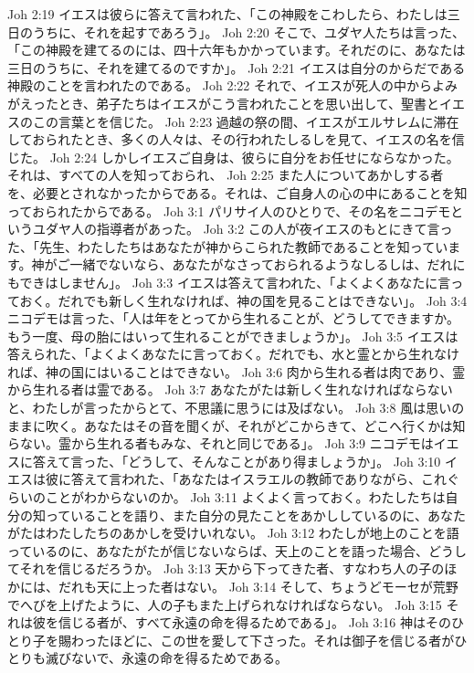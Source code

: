 Joh 2:19  イエスは彼らに答えて言われた、「この神殿をこわしたら、わたしは三日のうちに、それを起すであろう」。
Joh 2:20  そこで、ユダヤ人たちは言った、「この神殿を建てるのには、四十六年もかかっています。それだのに、あなたは三日のうちに、それを建てるのですか」。
Joh 2:21  イエスは自分のからだである神殿のことを言われたのである。
Joh 2:22  それで、イエスが死人の中からよみがえったとき、弟子たちはイエスがこう言われたことを思い出して、聖書とイエスのこの言葉とを信じた。
Joh 2:23  過越の祭の間、イエスがエルサレムに滞在しておられたとき、多くの人々は、その行われたしるしを見て、イエスの名を信じた。
Joh 2:24  しかしイエスご自身は、彼らに自分をお任せにならなかった。それは、すべての人を知っておられ、
Joh 2:25  また人についてあかしする者を、必要とされなかったからである。それは、ご自身人の心の中にあることを知っておられたからである。
Joh 3:1  パリサイ人のひとりで、その名をニコデモというユダヤ人の指導者があった。
Joh 3:2  この人が夜イエスのもとにきて言った、「先生、わたしたちはあなたが神からこられた教師であることを知っています。神がご一緒でないなら、あなたがなさっておられるようなしるしは、だれにもできはしません」。
Joh 3:3  イエスは答えて言われた、「よくよくあなたに言っておく。だれでも新しく生れなければ、神の国を見ることはできない」。
Joh 3:4  ニコデモは言った、「人は年をとってから生れることが、どうしてできますか。もう一度、母の胎にはいって生れることができましょうか」。
Joh 3:5  イエスは答えられた、「よくよくあなたに言っておく。だれでも、水と霊とから生れなければ、神の国にはいることはできない。
Joh 3:6  肉から生れる者は肉であり、霊から生れる者は霊である。
Joh 3:7  あなたがたは新しく生れなければならないと、わたしが言ったからとて、不思議に思うには及ばない。
Joh 3:8  風は思いのままに吹く。あなたはその音を聞くが、それがどこからきて、どこへ行くかは知らない。霊から生れる者もみな、それと同じである」。
Joh 3:9  ニコデモはイエスに答えて言った、「どうして、そんなことがあり得ましょうか」。
Joh 3:10  イエスは彼に答えて言われた、「あなたはイスラエルの教師でありながら、これぐらいのことがわからないのか。
Joh 3:11  よくよく言っておく。わたしたちは自分の知っていることを語り、また自分の見たことをあかししているのに、あなたがたはわたしたちのあかしを受けいれない。
Joh 3:12  わたしが地上のことを語っているのに、あなたがたが信じないならば、天上のことを語った場合、どうしてそれを信じるだろうか。
Joh 3:13  天から下ってきた者、すなわち人の子のほかには、だれも天に上った者はない。
Joh 3:14  そして、ちょうどモーセが荒野でへびを上げたように、人の子もまた上げられなければならない。
Joh 3:15  それは彼を信じる者が、すべて永遠の命を得るためである」。
Joh 3:16  神はそのひとり子を賜わったほどに、この世を愛して下さった。それは御子を信じる者がひとりも滅びないで、永遠の命を得るためである。
